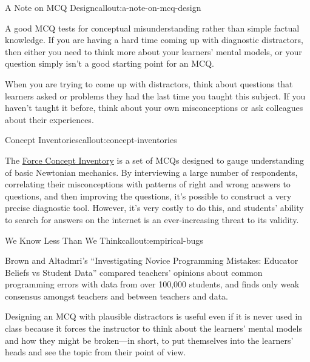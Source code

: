 \begin{callout}{A Note on MCQ Design}{callout:a-note-on-mcq-design}

\begin{gitemize}

\item
  A good MCQ tests for conceptual misunderstanding rather than simple
  factual knowledge. If you are having a hard time coming up with
  diagnostic distractors, then either you need to think more about your
  learners' mental models, or your question simply isn't a good starting
  point for an MCQ.

\item
  When you are trying to come up with distractors, think about questions
  that learners asked or problems they had the last time you taught this
  subject. If you haven't taught it before, think about your own
  misconceptions or ask colleagues about their experiences.

\end{gitemize}

\end{callout}

\begin{callout}{Concept Inventories}{callout:concept-inventories}

The \href{https://en.wikipedia.org/wiki/Force\_Concept\_Inventory}{Force
Concept Inventory} is a set of MCQs designed to gauge understanding of
basic Newtonian mechanics. By interviewing a large number of
respondents, correlating their misconceptions with patterns of right and
wrong answers to questions, and then improving the questions, it's
possible to construct a very precise diagnostic tool. However, it's very
costly to do this, and students' ability to search for answers on the
internet is an ever-increasing threat to its validity.

\end{callout}

\begin{callout}{We Know Less Than We Think}{callout:empirical-bugs}

Brown and Altadmri's ``Investigating Novice Programming Mistakes:
Educator Beliefs vs Student Data'' \cite{bib:brown-empiricao} compared
teachers' opinions about common programming errors with data from over
100,000 students, and finds only weak consensus amongst teachers and
between teachers and data.

\end{callout}

Designing an MCQ with plausible distractors is useful even if it is
never used in class because it forces the instructor to think about
the learners' mental models and how they might be broken---in short,
to put themselves into the learners' heads and see the topic from
their point of view.

